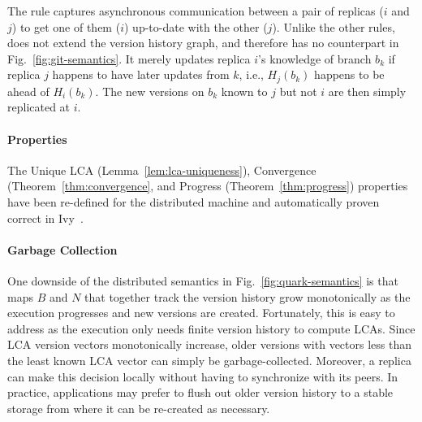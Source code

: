 The rule  captures asynchronous communication between
a pair of replicas ($i$ and $j$) to get one of them ($i$) up-to-date
with the other ($j$).  Unlike the other rules,  does
not extend the version history graph, and therefore has no counterpart
in Fig.~\ref{fig:git-semantics}. It merely updates replica $i$'s
knowledge of branch $b_k$ if replica $j$ happens to have later updates
from $k$, i.e., $H_j(b_k)$ happens to be ahead of $H_i(b_k)$. The new
versions on $b_k$ known to $j$ but not $i$ are then simply replicated
at $i$.

\paragraph{Properties} The Unique LCA
(Lemma~\ref{lem:lca-uniqueness}), Convergence
(Theorem~\ref{thm:convergence}, and Progress
(Theorem~\ref{thm:progress}) properties have been re-defined for the
\quark distributed machine and automatically proven correct in
Ivy~\cite{ivy}. 

\paragraph{Garbage Collection} One downside of the distributed
semantics in Fig.~\ref{fig:quark-semantics} is that maps $B$ and $N$
that together track the version history grow monotonically as the
execution progresses and new versions are created. Fortunately, this
is easy to address as the execution only needs finite version history
to compute LCAs. Since LCA version vectors monotonically increase,
older versions with vectors less than the least known LCA vector can
simply be garbage-collected. Moreover, a replica can make this
decision locally without having to synchronize with its peers. In
practice, applications may prefer to flush out older version history
to a stable storage from where it can be re-created as necessary.
